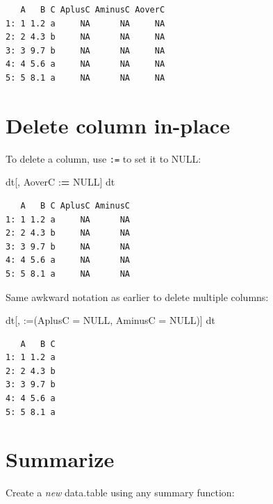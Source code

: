 \documentclass[
]{book}
\newenvironment{Shaded}{\begin{snugshade}}{\end{snugshade}}
\newcommand{\AttributeTok}[1]{\textcolor[rgb]{0.77,0.63,0.00}{#1}}
\newcommand{\ConstantTok}[1]{\textcolor[rgb]{0.00,0.00,0.00}{#1}}
\newcommand{\ErrorTok}[1]{\textcolor[rgb]{0.64,0.00,0.00}{\textbf{#1}}}
\newcommand{\NormalTok}[1]{#1}
\newcommand{\SpecialCharTok}[1]{\textcolor[rgb]{0.00,0.00,0.00}{#1}}
\newcommand{\StringTok}[1]{\textcolor[rgb]{0.31,0.60,0.02}{#1}}
\begin{document}
\begin{verbatim}
   A   B C AplusC AminusC AoverC
1: 1 1.2 a     NA      NA     NA
2: 2 4.3 b     NA      NA     NA
3: 3 9.7 b     NA      NA     NA
4: 4 5.6 a     NA      NA     NA
5: 5 8.1 a     NA      NA     NA
\end{verbatim}

\hypertarget{delete-column-in-place}{%
\section{Delete column in-place}\label{delete-column-in-place}}

To delete a column, use \texttt{:=} to set it to NULL:

\begin{Shaded}
\begin{Highlighting}[]
\NormalTok{dt[, AoverC }\SpecialCharTok{:}\ErrorTok{=} \ConstantTok{NULL}\NormalTok{]}
\NormalTok{dt}
\end{Highlighting}
\end{Shaded}

\begin{verbatim}
   A   B C AplusC AminusC
1: 1 1.2 a     NA      NA
2: 2 4.3 b     NA      NA
3: 3 9.7 b     NA      NA
4: 4 5.6 a     NA      NA
5: 5 8.1 a     NA      NA
\end{verbatim}

Same awkward notation as earlier to delete multiple columns:

\begin{Shaded}
\begin{Highlighting}[]
\NormalTok{dt[, }\StringTok{\textasciigrave{}}\AttributeTok{:=}\StringTok{\textasciigrave{}}\NormalTok{(}\AttributeTok{AplusC =} \ConstantTok{NULL}\NormalTok{, }\AttributeTok{AminusC =} \ConstantTok{NULL}\NormalTok{)]}
\NormalTok{dt}
\end{Highlighting}
\end{Shaded}

\begin{verbatim}
   A   B C
1: 1 1.2 a
2: 2 4.3 b
3: 3 9.7 b
4: 4 5.6 a
5: 5 8.1 a
\end{verbatim}

\hypertarget{summarize-2}{%
\section{Summarize}\label{summarize-2}}

Create a \emph{new} data.table using any summary function:
\end{document}

